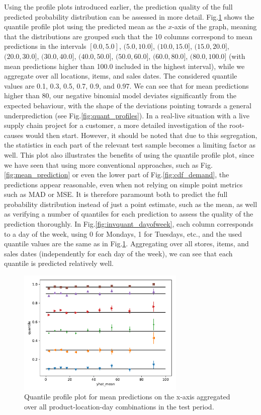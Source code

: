 \documentclass[BCOR=1mm, DIV=calc,10pt,
twoside=true,
twocolumn,
headings=normal]{scrartcl}
\newcommand{\fig}{Fig.}
\begin{document}
Using the profile plots introduced earlier, the prediction quality of the full predicted probability distribution can be assessed in more detail. \fig \ref{fig:invquant_mean} shows the quantile profile plot using the predicted mean as the $x$-axis of the graph, meaning that the distributions are grouped such that the 10 columns correspond to mean predictions in the intervals $[0.0, 5.0]$, $(5.0, 10.0]$, $(10.0, 15.0]$, $(15.0, 20.0]$, $(20.0, 30.0]$, $(30.0, 40.0]$, $(40.0, 50.0]$, $(50.0, 60.0]$, $(60.0, 80.0]$, $(80.0, 100.0]$ (with mean predictions higher than 100.0 included in the highest interval), while we aggregate over all locations, items, and sales dates. The considered quantile values are 0.1, 0.3, 0.5, 0.7, 0.9, and 0.97. We can see that for mean predictions higher than $80$, our negative binomial model deviates significantly from the expected behaviour, with the shape of the deviations pointing towards a general underprediction (see  \fig \ref{fig:quant_profiles}). In a real-live situation with a live supply chain project for a customer, a more detailed investigation of the root-causes would then start. However, it should be noted that due to this segregation, the statistics in each part of the relevant test sample becomes a limiting factor as well. This plot also illustrates the benefits of using the quantile profile plot, since we have seen that using more conventional approaches, such as \fig \ref{fig:mean_prediction} or even the lower part of \fig \ref{fig:cdf_demand}, the predictions appear reasonable, even when not relying on simple point metrics such as MAD or MSE. It is therefore paramount both to predict the full probability distribution instead of just a point estimate, such as the mean, as well as verifying a number of quantiles for each prediction to assess the quality of the prediction thoroughly. In \fig \ref{fig:invquant_dayofweek}, each column corresponds to a day of the week, using 0 for Mondays, 1 for Tuesdays, etc., and the used quantile values are the same as in \fig \ref{fig:invquant_mean}. Aggregating over all stores, items, and sales dates (independently for each day of the week), we can see that each quantile is predicted relatively well.

\begin{figure}
\begin{center}
\includegraphics[width=8cm]{../figures/invquant_yhat_mean}
\caption{\label{fig:invquant_mean} Quantile profile plot for mean predictions on the x-axis aggregated over all product-location-day combinations in the test period.}
\end{center}
\end{figure}
\end{document}
